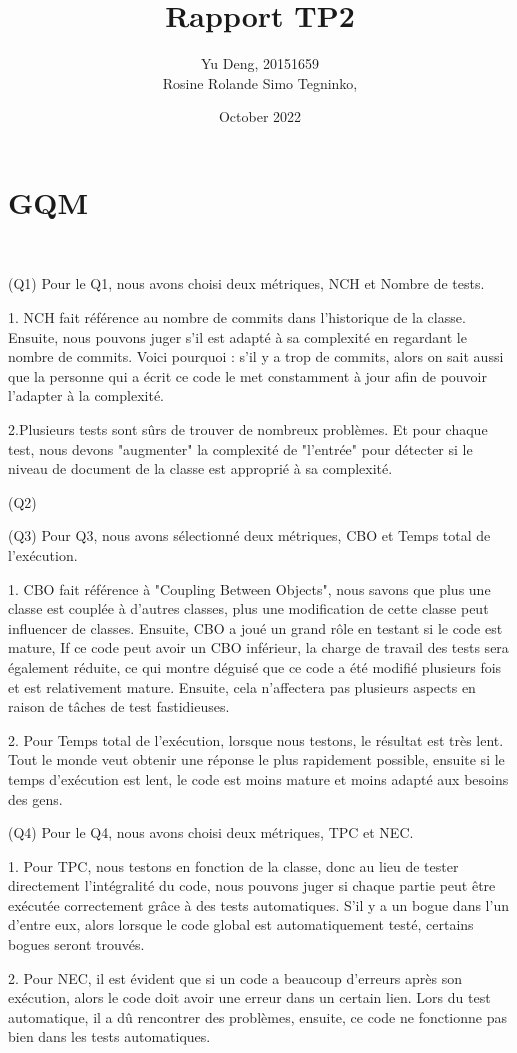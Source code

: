 \documentclass{article}
\title{Rapport TP2}
\author{Yu Deng, 20151659\\Rosine Rolande Simo Tegninko, }
\date{October 2022}
\begin{document}
\maketitle

\section{GQM}\\


\item(Q1)
Pour le Q1, nous avons choisi deux métriques, NCH et Nombre de tests.

1.	NCH fait référence au nombre de commits dans l'historique de la classe. Ensuite, nous pouvons juger s'il est adapté à sa complexité en regardant le nombre de commits. Voici pourquoi : s'il y a trop de commits, alors on sait aussi que la personne qui a écrit ce code le met constamment à jour afin de pouvoir l'adapter à la complexité.

2.Plusieurs tests sont sûrs de trouver de nombreux problèmes. Et pour chaque test, nous devons "augmenter" la complexité de "l'entrée" pour détecter si le niveau de document de la classe est approprié à sa complexité.


\item(Q2)


\item(Q3)
Pour Q3, nous avons sélectionné deux métriques, CBO et Temps total de l’exécution.


1. CBO fait référence à "Coupling Between Objects", nous savons que plus une classe est couplée à d'autres classes, plus une modification de cette classe peut influencer de classes. Ensuite, CBO a joué un grand rôle en testant si le code est mature, If ce code peut avoir un CBO inférieur, la charge de travail des tests sera également réduite, ce qui montre déguisé que ce code a été modifié plusieurs fois et est relativement mature. Ensuite, cela n'affectera pas plusieurs aspects en raison de tâches de test fastidieuses.

2. Pour Temps total de l’exécution, lorsque nous testons, le résultat est très lent. Tout le monde veut obtenir une réponse le plus rapidement possible, ensuite si le temps d'exécution est lent, le code est moins mature et moins adapté aux besoins des gens.


\item(Q4)
Pour le Q4, nous avons choisi deux métriques, TPC et NEC.

1. Pour TPC, nous testons en fonction de la classe, donc au lieu de tester directement l'intégralité du code, nous pouvons juger si chaque partie peut être exécutée correctement grâce à des tests automatiques. S'il y a un bogue dans l'un d'entre eux, alors lorsque le code global est automatiquement testé, certains bogues seront trouvés.

2. Pour NEC, il est évident que si un code a beaucoup d'erreurs après son exécution, alors le code doit avoir une erreur dans un certain lien. Lors du test automatique, il a dû rencontrer des problèmes, ensuite, ce code ne fonctionne pas bien dans les tests automatiques.
\end{document}
